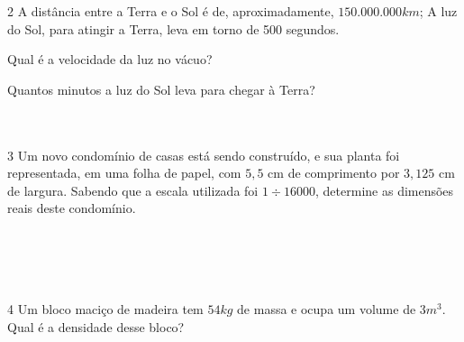 {{\\
 \\
\\
\\
\\



\num{2} A distância entre a Terra e o Sol é de, aproximadamente, $150.000.000 km$; 
A luz do Sol, para atingir a Terra, leva em torno de 500 segundos.

\begin{escolha}[itemsep=0pt]
\item Qual é a velocidade da luz no vácuo?
\item Quantos minutos a luz do Sol leva para chegar à Terra?
\end{escolha}

    \\
    \\






\num{3} Um novo condomínio de casas está sendo construído, e sua planta foi
representada, em uma folha de papel, com $5,5$ cm de comprimento por $3,125$
cm de largura. Sabendo que a escala utilizada foi $1 \div 16 000$, determine
as dimensões reais deste condomínio.

\\
\\
\\
\\

\num{4} Um bloco maciço de madeira tem $54 kg$ de massa e ocupa um volume de $3
m^3$. Qual é a densidade desse bloco?

\\
\\

}}
